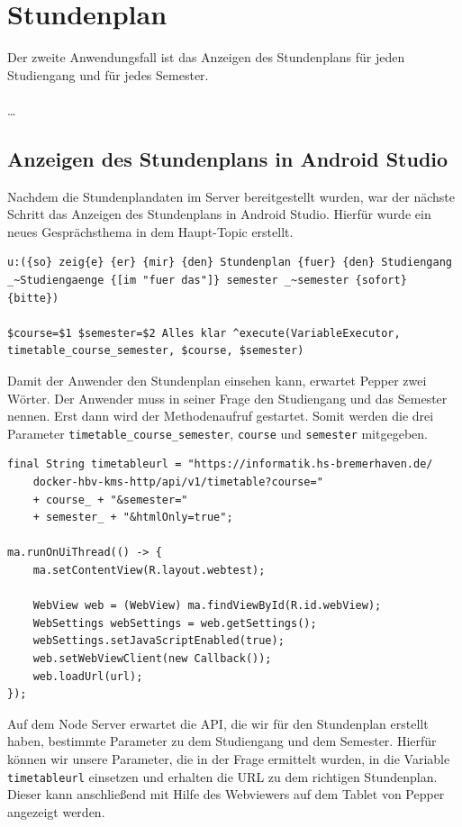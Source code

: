 \section{Stundenplan}

Der zweite Anwendungsfall ist das Anzeigen des Stundenplans für jeden Studiengang und für jedes Semester. 
\\\\
…
\\
\subsection{Anzeigen des Stundenplans in Android Studio}

Nachdem die Stundenplandaten im Server bereitgestellt wurden, war der nächste Schritt das Anzeigen des Stundenplans in Android Studio. 
Hierfür wurde ein neues Gesprächsthema in dem Haupt-Topic erstellt.\\

\begin{lstlisting}
u:({so} zeig{e} {er} {mir} {den} Stundenplan {fuer} {den} Studiengang 
_~Studiengaenge {[im "fuer das"]} semester _~semester {sofort} {bitte})

$course=$1 $semester=$2 Alles klar ^execute(VariableExecutor, 
timetable_course_semester, $course, $semester)
\end{lstlisting}

Damit der Anwender den Stundenplan einsehen kann, erwartet Pepper zwei Wörter. Der Anwender muss in seiner Frage den Studiengang und das Semester 
nennen. Erst dann wird der Methodenaufruf gestartet. Somit werden die drei Parameter \verb|timetable_course_semester|, 
\verb|course| und \verb|semester| mitgegeben.\\

\begin{lstlisting}
final String timetableurl = "https://informatik.hs-bremerhaven.de/
    docker-hbv-kms-http/api/v1/timetable?course="
    + course_ + "&semester="
    + semester_ + "&htmlOnly=true";

ma.runOnUiThread(() -> {
	ma.setContentView(R.layout.webtest);

	WebView web = (WebView) ma.findViewById(R.id.webView);
	WebSettings webSettings = web.getSettings();
	webSettings.setJavaScriptEnabled(true);
	web.setWebViewClient(new Callback());
	web.loadUrl(url);
});
\end{lstlisting}

Auf dem Node Server erwartet die API, die wir für den Stundenplan erstellt haben, bestimmte Parameter zu dem Studiengang und dem Semester. 
Hierfür können wir unsere Parameter, die in der Frage ermittelt wurden, in die Variable \verb|timetableurl| einsetzen und erhalten 
die URL zu dem richtigen Stundenplan. Dieser kann anschließend mit Hilfe des Webviewers auf dem Tablet von Pepper angezeigt werden. 

